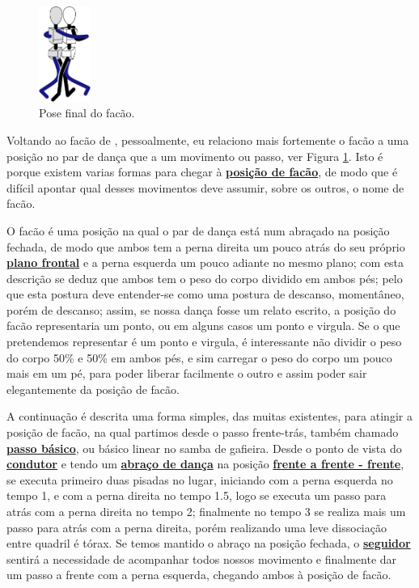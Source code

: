 \begin{figure}
  \vspace{-10pt}
  \centering
    \includegraphics[width=0.15\textwidth]{chapters/cap-historia-passos/facao.eps}
  \caption{Pose final do facão.}
  \label{fig:facaostickman}
  \vspace{-10pt}
\end{figure}
Voltando ao facão de \AnoLivro, pessoalmente, eu relaciono mais fortemente
o facão a uma posição no par de dança que 
a um movimento ou passo, ver Figura \ref{fig:facaostickman}. 
Isto é porque existem varias formas para chegar à \hyperref[def:facao-position]{\textbf{posição de facão}},
de modo que é difícil apontar qual desses movimentos deve assumir, sobre os outros, o nome de facão.

O facão é uma posição na qual o par de dança está num abraçado 
na posição fechada, 
de modo que ambos tem a perna direita um pouco atrás do seu próprio
\hyperref[def:PlanoFrontal]{\textbf{plano frontal}}
e a perna esquerda um pouco adiante no mesmo plano; com esta descrição se deduz 
que ambos tem o peso do corpo dividido em ambos pés; pelo que esta postura
deve entender-se como uma postura de descanso, momentâneo, porém de descanso;
assim, se nossa dança fosse um relato escrito, a posição do facão
representaria um ponto, ou em alguns casos um ponto e virgula.
Se o que pretendemos representar é um ponto e virgula, 
é interessante não dividir o peso do corpo 50\% e 50\% em ambos pés,
e sim carregar o peso do corpo um pouco mais em um pé,
para poder liberar facilmente o outro e assim poder sair elegantemente da posição de facão.  

A continuação é descrita uma forma simples, das muitas existentes, para atingir a posição de facão,
na qual partimos desde o passo frente-trás, também chamado \hyperref[subsec:passobasico]{\textbf{passo básico}}, 
ou básico linear no samba de gafieira. 
Desde o ponto de vista do \hyperref[def:Condutor]{\textbf{condutor}} e 
tendo um \hyperref[def:abracodedanca]{\textbf{abraço de dança}} 
na posição \hyperref[def:fff-position]{\textbf{frente a frente - frente}},
se executa primeiro duas pisadas no lugar, iniciando com a perna esquerda no tempo 1, 
e com a perna direita no tempo 1.5,
logo se executa um passo  para atrás com a perna direita no tempo 2; 
finalmente no tempo 3 se realiza mais um passo para atrás com a perna direita,
porém realizando uma leve dissociação entre quadril é tórax. 
Se temos mantido o abraço na posição fechada, 
o \hyperref[def:Seguidor]{\textbf{seguidor}} sentirá a 
necessidade de acompanhar todos nossos movimento e finalmente dar um passo a frente com a perna esquerda,
chegando ambos à posição de facão.  


